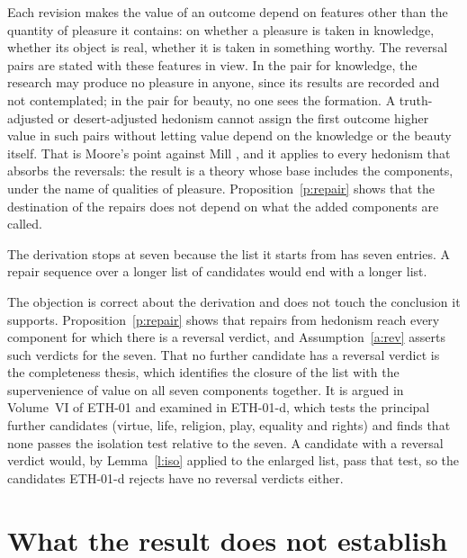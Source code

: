 \documentclass{situationist-preprint}
\begin{document}
\begin{reply}
Each revision makes the value of an outcome depend on features other than the quantity of pleasure it contains: on whether a pleasure is taken in knowledge, whether its object is real, whether it is taken in something worthy. The reversal pairs are stated with these features in view. In the pair for knowledge, the research may produce no pleasure in anyone, since its results are recorded and not contemplated; in the pair for beauty, no one sees the formation. A truth-adjusted or desert-adjusted hedonism cannot assign the first outcome higher value in such pairs without letting value depend on the knowledge or the beauty itself. That is Moore's point against Mill \citep[\S48]{Moore1903}, and it applies to every hedonism that absorbs the reversals: the result is a theory whose base includes the components, under the name of qualities of pleasure. Proposition~\ref{p:repair} shows that the destination of the repairs does not depend on what the added components are called.
\end{reply}

\begin{objection}
The derivation stops at seven because the list it starts from has seven entries. A repair sequence over a longer list of candidates would end with a longer list.
\end{objection}

\begin{reply}
The objection is correct about the derivation and does not touch the conclusion it supports. Proposition~\ref{p:repair} shows that repairs from hedonism reach every component for which there is a reversal verdict, and Assumption~\ref{a:rev} asserts such verdicts for the seven. That no further candidate has a reversal verdict is the completeness thesis, which identifies the closure of the list with the supervenience of value on all seven components together. It is argued in Volume~VI of ETH-01 and examined in ETH-01-d, which tests the principal further candidates (virtue, life, religion, play, equality and rights) and finds that none passes the isolation test relative to the seven. A candidate with a reversal verdict would, by Lemma~\ref{l:iso} applied to the enlarged list, pass that test, so the candidates ETH-01-d rejects have no reversal verdicts either.
\end{reply}

\section{What the result does not establish}\label{s:not}
\end{document}
